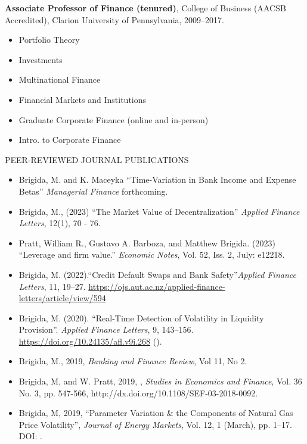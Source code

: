 \documentclass[9pt]{article}
\begin{document}
{\bf Associate Professor of Finance (tenured)}, College of Business (AACSB Accredited), Clarion University of Pennsylvania, 2009--2017.
\begin{itemize}[noitemsep, nolistsep]
\item Portfolio Theory
\item Investments
\item Multinational Finance
\item Financial Markets and Institutions
\item Graduate Corporate Finance (online and in-person)
\item Intro. to Corporate Finance
\end{itemize}
\vspace{10pt}
PEER-REVIEWED JOURNAL PUBLICATIONS
\begin{itemize}[noitemsep, nolistsep]
\item Brigida, M. and K. Maceyka ``Time-Variation in Bank Income and Expense Betas'' {\it Managerial Finance} forthcoming.
\item Brigida, M., (2023) ``The Market Value of Decentralization'' {\it Applied Finance Letters}, 12(1), 70 - 76.
\item Pratt, William R., Gustavo A. Barboza, and Matthew Brigida. (2023) ``Leverage and firm value.'' {\it Economic Notes}, Vol. 52, Iss. 2, July: e12218.
\item Brigida, M. (2022).``Credit Default Swaps and Bank Safety''{\it Applied Finance Letters}, 11, 19--27.  \url{https://ojs.aut.ac.nz/applied-finance-letters/article/view/594}
\item Brigida, M. (2020). ``Real-Time Detection of Volatility in Liquidity Provision''. {\it Applied Finance Letters}, 9, 143--156. \url{https://doi.org/10.24135/afl.v9i.268} (\href{https://arxiv.org/abs/2011.10930}{\color{Blue}{arXiv version}}).
\item Brigida, M., 2019, \href{http://www.bankingandfinancereview.com/bfr/index.php/bfr/article/view/1074/180}{\color{Blue}{``The Effect of Bank Regulatory Capital Levels on Loan Types''}}{\it Banking and Finance Review}, Vol 11, No 2.
\item Brigida, M, and W. Pratt, 2019, \href{https://papers.ssrn.com/sol3/papers.cfm?abstract_id=2848527}{\color{Blue}{High-Frequency Trading and the Weekly Natural Gas Storage Report}}, {\it Studies in Economics and Finance}, Vol. 36 No. 3, pp. 547-566, http://dx.doi.org/10.1108/SEF-03-2018-0092.
\item Brigida, M, 2019, ``Parameter Variation \& the Components of Natural Gas Price Volatility'', {\it Journal of Energy Markets}, Vol. 12, 1 (March), pp. 1--17. DOI: \href{https://doi.org/10.21314/JEM.2018.182}{\color{Blue}{10.21314/JEM.2018.182}}.

\end{itemize}
\end{document}
